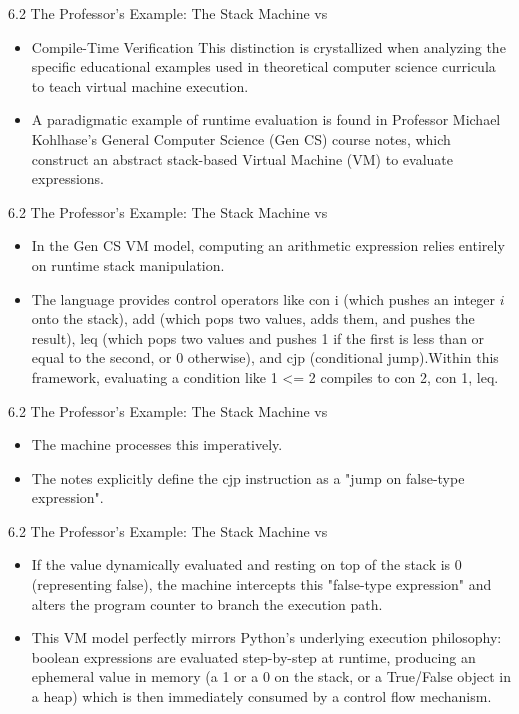 \documentclass[10pt]{beamer}
\begin{document}
\begin{frame}{6.2 The Professor's Example: The Stack Machine vs}
\begin{itemize}\setlength{\itemsep}{1.5em}
  \item Compile-Time Verification This distinction is crystallized when analyzing the specific educational examples used in theoretical computer science curricula to teach virtual machine execution.
  \item A paradigmatic example of runtime evaluation is found in Professor Michael Kohlhase's General Computer Science (Gen CS) course notes, which construct an abstract stack-based Virtual Machine (VM) to evaluate expressions.
\end{itemize}
\end{frame}

\begin{frame}{6.2 The Professor's Example: The Stack Machine vs}
\begin{itemize}\setlength{\itemsep}{1.5em}
  \item In the Gen CS VM model, computing an arithmetic expression relies entirely on runtime stack manipulation.
  \item The language provides control operators like con i (which pushes an integer $i$ onto the stack), add (which pops two values, adds them, and pushes the result), leq (which pops two values and pushes 1 if the first is less than or equal to the second, or 0 otherwise), and cjp (conditional jump).Within this framework, evaluating a condition like 1 <= 2 compiles to con 2, con 1, leq.
\end{itemize}
\end{frame}

\begin{frame}{6.2 The Professor's Example: The Stack Machine vs}
\begin{itemize}\setlength{\itemsep}{1.5em}
  \item The machine processes this imperatively.
  \item The notes explicitly define the cjp instruction as a "jump on false-type expression".
\end{itemize}
\end{frame}

\begin{frame}{6.2 The Professor's Example: The Stack Machine vs}
\begin{itemize}\setlength{\itemsep}{1.5em}
  \item If the value dynamically evaluated and resting on top of the stack is 0 (representing false), the machine intercepts this "false-type expression" and alters the program counter to branch the execution path.
  \item This VM model perfectly mirrors Python's underlying execution philosophy: boolean expressions are evaluated step-by-step at runtime, producing an ephemeral value in memory (a 1 or a 0 on the stack, or a True/False object in a heap) which is then immediately consumed by a control flow mechanism.
\end{itemize}
\end{frame}
\end{document}
